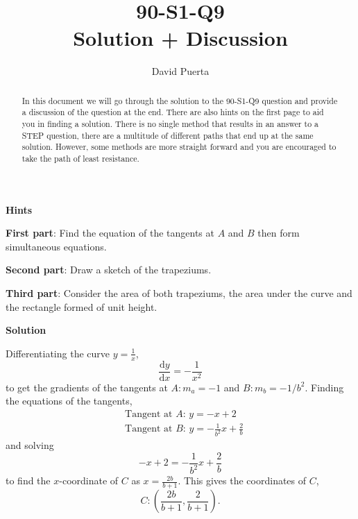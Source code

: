 \documentclass{article}
\title{90-S1-Q9 \\ Solution + Discussion}
\author{David Puerta}
\date{}
\begin{document}
\maketitle

\begin{abstract}
    \noindent In this document we will go through the solution to the 90-S1-Q9 question and provide a discussion of the question at the end. There are also hints on the first page to aid you in finding a solution. There is no single method that results in an answer to a STEP question, there are a multitude of different paths that end up at the same solution. However, some methods are more straight forward and you are encouraged to take the path of least resistance.  
\end{abstract}

\vspace{1cm}

\begin{center}
    \textbf{Hints}
\end{center}

\textbf{First part}: Find the equation of the tangents at $A$ and $B$ then form simultaneous equations. 

\vspace{1cm}

\textbf{Second part}:  Draw a sketch of the trapeziums.

\vspace{1cm}

\textbf{Third part}: Consider the area of both trapeziums, the area under the curve and the rectangle formed of unit height.



\newpage

\begin{center}
    \textbf{Solution}
\end{center}

\vspace{0.5cm}

Differentiating the curve $y=\frac{1}{x}$,
\[
\frac{\mathrm{d}y}{\mathrm{d}x} = -\frac{1}{x^2}
\]
to get the gradients of the tangents at $A:m_a=-1$ and $B:m_b=-1/b^2$. Finding the equations of the tangents,
\begin{align*}
& \text{Tangent at $A$: } y = -x+2 \\
& \text{Tangent at $B$: } y = -\frac{1}{b^2}x+\frac{2}{b} 
\end{align*}
and solving 
\[
 -x+2 = -\frac{1}{b^2}x+\frac{2}{b}
\]
to find the $x$-coordinate of $C$ as $x=\frac{2b}{b+1}$. This gives the coordinates of $C$,
\[
C:\left(\frac{2b}{b+1},\frac{2}{b+1}\right).
\]
\end{document}
